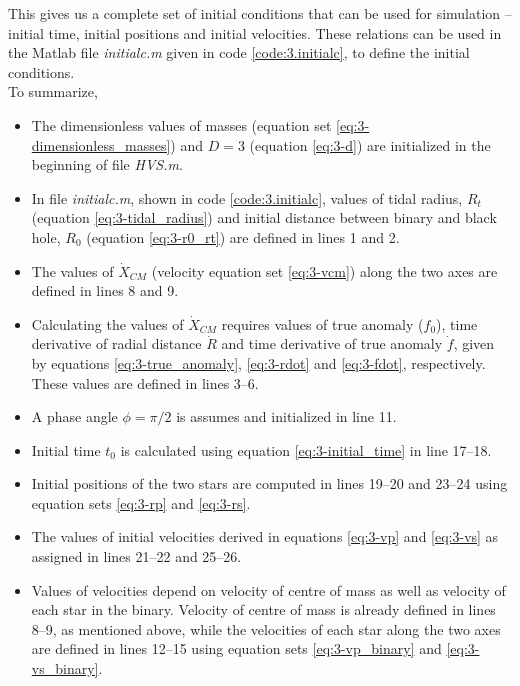 \documentclass[a4paper]{article}
\begin{document}
\begin{enumerate} [label*=\textbf{(\alph*)}]
					This gives us a complete set of initial conditions that can be used for simulation -- initial time, initial positions and initial velocities. These relations can be used in the Matlab file \emph{initialc.m} given in code \ref{code:3.initialc}, to define the initial conditions. \\
\newpage					
					To summarize,
					\begin{itemize}
						\item The dimensionless values of masses (equation set \ref{eq:3-dimensionless_masses}) and \(D=3\) (equation \ref{eq:3-d}) are initialized in the beginning of file \emph{HVS.m}.
						\item In file \emph{initialc.m}, shown in code \ref{code:3.initialc}, values of tidal radius, \(R_t\) (equation \ref{eq:3-tidal_radius}) and initial distance between binary and black hole, \(R_0\) (equation \ref{eq:3-r0_rt}) are defined in lines 1 and 2.
						\item The values of \(\dot{X}_{CM}^{}\) (velocity equation set \ref{eq:3-vcm}) along the two axes are defined in lines 8 and 9.
						\item Calculating the values of \(\dot{X}_{CM}^{}\) requires values of true anomaly (\(f_0\)), time derivative of radial distance \(\dot{R}\) and time derivative of true anomaly \(\dot{f}\), given by equations \ref{eq:3-true_anomaly}, \ref{eq:3-rdot} and \ref{eq:3-fdot}, respectively. These values are defined in lines 3--6.
						\item A phase angle \(\phi = \pi/2\) is assumes and initialized in line 11.
						\item Initial time \(t_0\) is calculated using equation \ref{eq:3-initial_time} in line 17--18.
						\item Initial positions of the two stars are computed in lines 19--20 and 23--24 using equation sets \ref{eq:3-rp} and \ref{eq:3-rs}.
						\item The values of initial velocities derived in equations \ref{eq:3-vp} and \ref{eq:3-vs} as assigned in lines 21--22 and 25--26.
						\item Values of velocities depend on velocity of centre of mass as well as velocity of each star in the binary. Velocity of centre of mass is already defined in lines 8--9, as mentioned above, while the velocities of each star along the two axes are defined in lines 12--15 using equation sets \ref{eq:3-vp_binary} and \ref{eq:3-vs_binary}.
					\end{itemize}
					

\end{enumerate}
\end{document}
